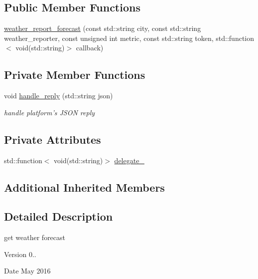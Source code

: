 \subsection*{Public Member Functions}
\begin{DoxyCompactItemize}
\item 
\hyperlink{classrapp_1_1cloud_1_1weather__report__forecast_a068808d8b323fd126e1e0755cb00cccd}{weather\-\_\-report\-\_\-forecast} (const std\-::string city, const std\-::string weather\-\_\-reporter, const unsigned int metric, const std\-::string token, std\-::function$<$ void(std\-::string)$>$ callback)
\end{DoxyCompactItemize}
\subsection*{Private Member Functions}
\begin{DoxyCompactItemize}
\item 
void \hyperlink{classrapp_1_1cloud_1_1weather__report__forecast_a8e0084466e12c7ce43783e908b02e47f}{handle\-\_\-reply} (std\-::string json)
\begin{DoxyCompactList}\small\item\em handle platform's J\-S\-O\-N reply \end{DoxyCompactList}\end{DoxyCompactItemize}
\subsection*{Private Attributes}
\begin{DoxyCompactItemize}
\item 
std\-::function$<$ void(std\-::string)$>$ \hyperlink{classrapp_1_1cloud_1_1weather__report__forecast_afad181406c2d9f1d292e6eedc8ec82fd}{delegate\-\_\-}
\end{DoxyCompactItemize}
\subsection*{Additional Inherited Members}


\subsection{Detailed Description}
get weather forecast 

\begin{DoxyVersion}{Version}
0.. 
\end{DoxyVersion}
\begin{DoxyDate}{Date}
May 2016 
\end{DoxyDate}



